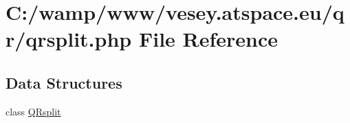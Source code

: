 \hypertarget{qrsplit_8php}{\section{C\-:/wamp/www/vesey.atspace.\-eu/qr/qrsplit.php File Reference}
\label{qrsplit_8php}
}
\subsection*{Data Structures}
\begin{DoxyCompactItemize}
\item 
class \hyperlink{class_q_rsplit}{Q\-Rsplit}
\end{DoxyCompactItemize}
